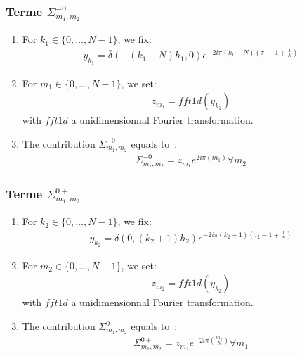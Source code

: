 \subsubsection{Terme $\Sigma_{m_1,m_2}^{-0}$}
\begin{enumerate}
\item For $k_1\in\{0,\hdots,N-1\}$, we fix:
\begin{align*}
y_{k_1}= \bar{\delta}(-(k_1-N)h_1,0)e^{-2i\pi (k_1-N)\left(\tau_1-1+\frac{1}{N}\right)}
\end{align*}
\item For $m_1\in\{0,\hdots,N-1\}$, we set:
\begin{align*}
  z_{m_1}=fft1d(y_{k_1})
\end{align*}
with $fft1d$ a unidimensionnal Fourier transformation.
\item The contribution $\Sigma_{m_1,m_2}^{-0}$ equals to~:
\begin{align*}
  \Sigma_{m_1,m_2}^{-0}=z_{m_1}e^{2i\pi\left(m_1\right)} \forall m_2
\end{align*}
\end{enumerate}

\subsubsection{Terme $\Sigma_{m_1,m_2}^{0+}$}
\begin{enumerate}
\item For $k_2\in\{0,\hdots,N-1\}$, we fix:
\begin{align*}
y_{k_2}= \delta(0,(k_2+1)h_2)e^{-2i\pi (k_2+1)\left(\tau_2-1+\frac{1}{N}\right)}
\end{align*}
\item For $m_2\in\{0,\hdots,N-1\}$, we set:
\begin{align*}
  z_{m_2}=fft1d(y_{k_2})
\end{align*}
with $fft1d$ a unidimensionnal Fourier transformation.
\item The contribution $\Sigma_{m_1,m_2}^{0+}$ equals to~:
\begin{align*}
  \Sigma_{m_1,m_2}^{0+}=z_{m_2}e^{-2i\pi\left(\frac{m_2}{N}\right)} \forall m_1
\end{align*}
\end{enumerate}

